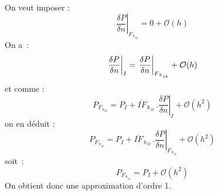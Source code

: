 \\
On veut imposer :
\begin{equation}
\left. \displaystyle\frac{\delta P}{\delta n}\right|_{F_{\,b_{\,ik}}} = 0 + \mathcal{O}(h)
\end{equation}
On a~:
\begin{equation}\notag
\left. \displaystyle\frac{\delta P}{\delta n}\right|_{I} =
\displaystyle\left. \displaystyle\frac{\delta P}{\delta
n}\right|_{F_{\,b_{\,ik}}} + \mathcal{O}(h)
\end{equation}
et comme :
\begin{equation}
P_{F_{\,b_{\,ik}}} = P_I + \overline{IF}_{\,b_{\,ik}}\,.\left. \displaystyle\frac{\delta P}{\delta
n}\right|_I + \mathcal{O}(h^2)
\end{equation}
on en d\'eduit :
\begin{equation}
P_{F_{\,b_{\,ik}}} = P_I + \overline{IF}_{\,b_{\,ik}}\,.\left. \displaystyle\frac{\delta P}{\delta
n}\right|_{F_{\,b_{\,ik}}} + \mathcal{O}(h^2)
\end{equation}
soit~:
\begin{equation}
P_{F_{\,b_{\,ik}}} = P_I +  \mathcal{O}(h^2)
\end{equation}
On obtient donc une approximation d'ordre 1.\\
